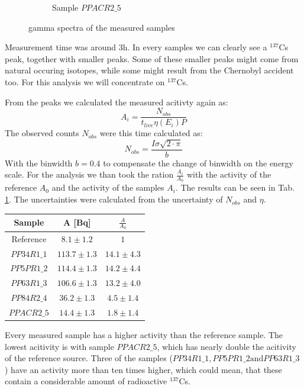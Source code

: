 \begin{figure}[h]
\begin{subfigure}{.5\textwidth}
  \caption{Sample $PPACR2\_5$}
\end{subfigure}%
\caption{gamma spectra of the measured samples}
\label{cher_samples}
\end{figure}
Measurement time was around 3h.
In every samples we can clearly  see a  $^{137}$Cs peak, together with smaller peaks.
Some of these smaller peaks might come from natural occuring isotopes, while some might result from the Chernobyl accident too.
For this analysis we will concentrate on $^{137}$Cs.

From the peaks we calculated the measured acitivty again as:
\begin{equation}
A_i = \frac{N_{obs}}{t_{live} \eta (E_i) P}
\end{equation}
The observed counts $N_{obs}$ were this time calculated as:
\begin{equation}
N_{obs} = \frac{I \sigma \sqrt{2 \cdot \pi}}{b}
\end{equation}
With the binwidth $b = 0.4$ to compensate the change of binwidth on the energy scale.
For the analysis we than took the ration $\frac{A_i}{A_0}$ with the activity of the reference $A_0$ and the activity of the samples $A_i$.
The results can be seen in Tab. \ref{cher_results}.
The uncertainties were calculated from the uncertainty of $N_{obs}$ and $\eta$.

\begin{table}[h]
\centering
\begin{tabular}{c |c | c }
\hline
Sample & A [Bq] & $\frac{A}{A_0}$ \\
\hline
Reference & $8.1 \pm 1.2   $ & $1$ \\
$PP34R1\_1  $& $113.7 \pm 1.3$ & $14.1 \pm 4.3$ \\
$PP5PR1\_2  $& $114.4 \pm 1.3$ & $14.2 \pm 4.4$ \\
$PP63R1\_3  $& $106.6 \pm 1.3$ & $13.2 \pm 4.0$ \\
$PP84R2\_4  $& $36.2 \pm 1.3  $ & $4.5 \pm 1.4$ \\
$PPACR2\_5 $& $14.4 \pm 1.3  $ & $1.8 \pm 1.4$ \\
\hline
\end{tabular}
\label{cher_results}
\end{table}
Every measured sample has a higher activity than the reference sample.
The lowest acitivity is with sample $PPACR2\_5$, which has nearly double the acitivity of the reference source.
Three of the samples ($PP34R1\_1, PP5PR1\_2 \text{and} PP63R1\_3$) have an activity more than ten times higher, which could mean, that these contain a considerable amount of radioactive  $^{137}$Cs.
